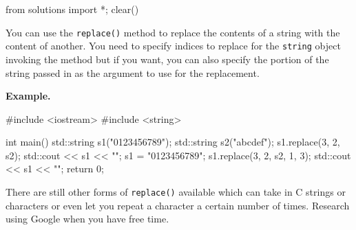 \begin{python0}
from solutions import *; clear()
\end{python0}

You can use the \texttt{replace()} method to replace the contents of a
string with the content of another. You need to specify indices to
replace for the \texttt{string} object invoking the method but if you
want, you can also specify the portion of the string passed in as the
argument to use for the replacement.

\textbf{Example.}

\begin{console}
#include <iostream>
#include <string>

int main()
{   
    std::string s1("0123456789");
    std::string s2("abcdef");
    s1.replace(3, 2, s2);
    std::cout << s1 << "\n";
    s1 = "0123456789";
    s1.replace(3, 2, s2, 1, 3);
    std::cout << s1 << "\n";
    return 0;
} 
\end{console}

There are still other forms of \texttt{replace()} available which can take
in C strings or characters or even let you repeat a character a certain
number of times. Research using Google when you have free time.

